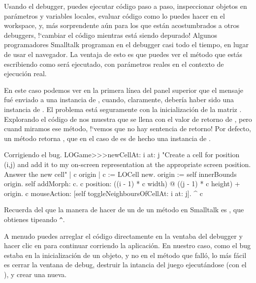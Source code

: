 \documentclass[a4paper,10pt,twoside]{book}
\begin{document}
Usando el debugger, puedes ejecutar c\'odigo paso a paso, inspeccionar objetos en par\'ametros y variables locales, evaluar c\'odigo como lo puedes hacer en el workspace, y, m\'as sorprendente a\'un para los que est\'an acostumbrados a otros debuggers, !`cambiar el c\'odigo mientras est\'a siendo depurado! Algunos programadores Smalltalk programan en el debugger casi todo el tiempo, en lugar de usar el navegador. La ventaja de esto es que puedes ver el m\'etodo que est\'as escribiendo como ser\'a ejecutado, con par\'ametros reales en el contexto de ejecuci\'on real.

En este caso podemos ver en la primera l\'inea del panel superior que el mensaje  fu\'e enviado a una instancia de , cuando, claramente, deber\'ia haber sido una instancia de .
El problema est\'a seguramente con la inicializaci\'on de la matriz .
Explorando el c\'odigo de  nos muestra que  se llena con el valor de retorno de , pero cuand miramos ese m\'etodo, !`vemos que no hay sentencia de retorno!
Por defecto, un m\'etodo retorna , que en el caso de  es de hecho una instancia de .


\begin{method}{Corrigiendo el bug.}
LOGame>>>newCellAt: i at: j
   "Create a cell for position (i,j) and add it to my on-screen
   representation at the appropriate screen position.  Answer the new cell"
   | c origin |
   c := LOCell new.
   origin := self innerBounds origin.
   self addMorph: c.
   c position: ((i - 1) * c width) @ ((j - 1) * c height) + origin.
   c mouseAction: [self toggleNeighboursOfCellAt: i at: j].
   ^ c
\end{method}

\noindent
Recuerda del  que la manera de hacer  de un  de un m\'etodo en Smalltalk es \ct{^}, que obtienes tipeando \verb|^|.

A menudo puedes arreglar el c\'odigo directamente en la ventaba del debugger y hacer clic en  para continuar corriendo la aplicaci\'on.
En nuestro caso, como el bug estaba en la inicializaci\'on de un objeto, y no en el m\'etodo que fall\'o, lo m\'as f\'acil
es cerrar la ventana de debug, destruir la intancia del juego ejecut\'andose (con el ), y crear una nueva.
\end{document}

